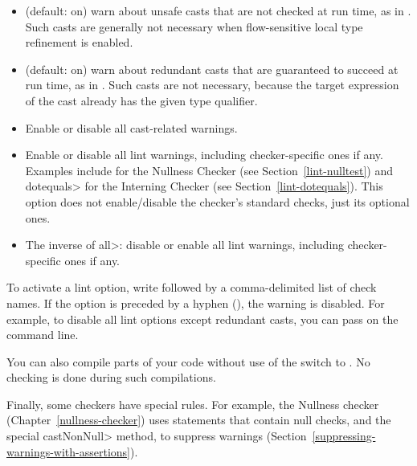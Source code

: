 \begin{itemize}

\item
   (default: on) warn about unsafe casts that are not
  checked at run time, as in .  Such casts
  are generally not necessary when flow-sensitive local type refinement is
  enabled.

\item
   (default: on) warn about redundant
  casts that are guaranteed to succeed at run time,
  as in .  Such casts are not necessary,
  because the target expression of the cast already has the given type
  qualifier.

\item
   Enable or disable all cast-related warnings.

\item
   Enable or disable all lint warnings, including
  checker-specific ones if any.  Examples include  for the
  Nullness Checker (see Section~\ref{lint-nulltest}) and \<dotequals> for
  the Interning Checker (see Section~\ref{lint-dotequals}).  This option
  does not enable/disable the checker's standard checks, just its optional
  ones.

\item
   The inverse of \<all>:  disable or enable all lint warnings,
  including checker-specific ones if any.

\end{itemize}


\noindent
To activate a lint option, write  followed by a
comma-delimited list of check names.  If the option is preceded by a
hyphen (\code{-}), the warning is disabled.  For example, to disable all
lint options except redundant casts, you can pass
 on the command line.


You can also compile parts of your code without use of the
 switch to .  No checking is done during
such compilations.

Finally, some checkers have special rules.  For example, the Nullness
checker (Chapter~\ref{nullness-checker}) uses  statements that contain
null checks, and the special \<castNonNull> method, to suppress warnings
(Section~\ref{suppressing-warnings-with-assertions}).



